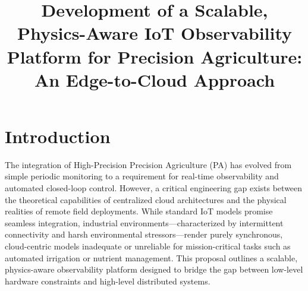 \documentclass[conference]{IEEEtran}
\begin{document}
\title{Development of a Scalable, Physics-Aware IoT Observability Platform for Precision Agriculture: An Edge-to-Cloud Approach\\
}

\author{
}

\maketitle



\section{Introduction}
The integration of High-Precision Precision Agriculture (PA) has evolved from simple periodic monitoring to a requirement for real-time observability and automated closed-loop control. However, a critical engineering gap exists between the theoretical capabilities of centralized cloud architectures and the physical realities of remote field deployments. While standard IoT models promise seamless integration, industrial environments—characterized by intermittent connectivity and harsh environmental stressors—render purely synchronous, cloud-centric models inadequate or unreliable for mission-critical tasks such as automated irrigation or nutrient management. This proposal outlines a scalable, physics-aware observability platform designed to bridge the gap between low-level hardware constraints and high-level distributed systems.
\end{document}
